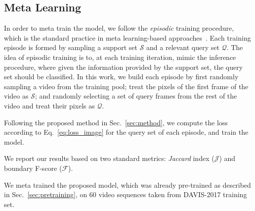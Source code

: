 \documentclass[10pt,twocolumn,letterpaper]{article}
\begin{document}
\subsection{Meta Learning}\label{sec:metalearning}
In order to meta train the model, we follow the {\it episodic} training procedure, which is the standard practice in meta learning-based approaches~\cite{NIPS2016_6385, NIPS2017_6996, MAML}. Each training episode is formed by sampling a support set $\mathcal{S}$ and a relevant query set $\mathcal{Q}$. The idea of episodic training is to, at each training iteration, mimic the inference procedure, where given the information provided by the support set, the query set should be classified. In this work, we build each episode by first randomly sampling a video from the training pool; treat the pixels of the first frame of the video as $\mathcal{S}$; and randomly selecting a set of query frames from the rest of the video and treat their pixels as $\mathcal{Q}$.

Following the proposed method in Sec.~\ref{sec:method}, we compute the loss according to Eq.~\ref{eq:loss_image} for the query set of each episode, and train the model.

We report our results based on two standard metrics: {\it Jaccard} index ($\mathcal{J}$) and boundary F-score ($\mathcal{F}$).

We meta trained the proposed model, which was already pre-trained as described in Sec.~\ref{sec:pretraining}, on $60$ video sequences taken from DAVIS-2017 training set. 
\end{document}
